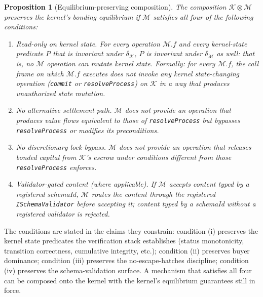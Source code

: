 \documentclass[11pt,a4paper]{article}
\newtheorem{proposition}[theorem]{Proposition}
\theoremstyle{definition}
\theoremstyle{remark}
\begin{document}
\begin{proposition}[Equilibrium-preserving composition]
\label{prop:coordinator}
The composition $\mathcal{K} \otimes \mathcal{M}$ preserves the
kernel's bonding equilibrium if $\mathcal{M}$ satisfies all four of
the following conditions:
\begin{enumerate}[label=(\roman*)]
  \item \emph{Read-only on kernel state.} For every operation
    $\mathcal{M}.f$ and every kernel-state predicate $P$ that is
    invariant under $\delta_{\mathcal{K}}$, $P$ is invariant under
    $\delta_{\mathcal{M}}$ as well: that is, no $\mathcal{M}$
    operation can mutate kernel state. Formally: for every
    $\mathcal{M}.f$, the call frame on which $\mathcal{M}.f$
    executes does not invoke any kernel state-changing operation
    (\texttt{commit} or \texttt{resolveProcess}) on $\mathcal{K}$
    in a way that produces unauthorized state mutation.
  \item \emph{No alternative settlement path.} $\mathcal{M}$ does
    not provide an operation that produces value flows equivalent
    to those of \texttt{resolveProcess} but bypasses
    \texttt{resolveProcess} or modifies its preconditions.
  \item \emph{No discretionary lock-bypass.} $\mathcal{M}$ does not
    provide an operation that releases bonded capital from
    $\mathcal{K}$'s escrow under conditions different from those
    \texttt{resolveProcess} enforces.
  \item \emph{Validator-gated content (where applicable).} If
    $\mathcal{M}$ accepts content typed by a registered schemaId,
    $\mathcal{M}$ routes the content through the registered
    \texttt{ISchemaValidator} before accepting it; content typed by
    a schemaId without a registered validator is rejected.
\end{enumerate}
\end{proposition}

The conditions are stated in the claims they constrain: condition
(i) preserves the kernel state predicates the verification stack
establishes (status monotonicity, transition correctness, cumulative
integrity, etc.); condition (ii) preserves buyer dominance; condition
(iii) preserves the no-escape-hatches discipline; condition (iv)
preserves the schema-validation surface. A mechanism that satisfies
all four can be composed onto the kernel with the kernel's
equilibrium guarantees still in force.
\end{document}
